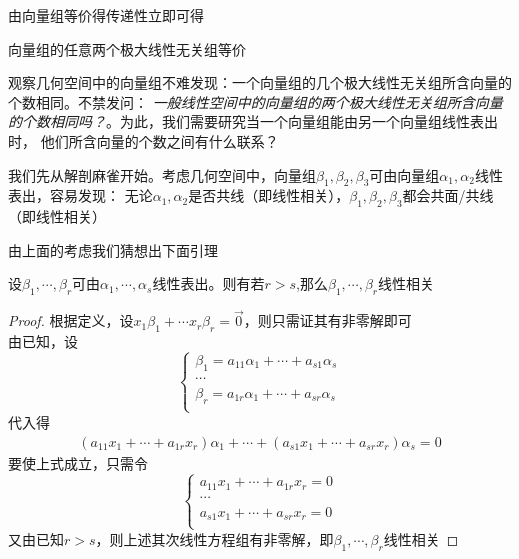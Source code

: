 由向量组等价得传递性立即可得
\begin{theorem}
    向量组的任意两个极大线性无关组等价
\end{theorem}

观察几何空间中的向量组不难发现：一个向量组的几个极大线性无关组所含向量的个数相同。不禁发问：
\emph{一般线性空间中的向量组的两个极大线性无关组所含向量的个数相同吗？}。为此，我们需要研究当一个向量组能由另一个向量组线性表出时，
他们所含向量的个数之间有什么联系？

我们先从解剖麻雀开始。考虑几何空间中，向量组$\beta_1, \beta_2, \beta_3$可由向量组$\alpha_1, \alpha_2$线性表出，容易发现：
无论$\alpha_1, \alpha_2$是否共线（即线性相关），$\beta_1, \beta_2, \beta_3$都会共面/共线（即线性相关）

由上面的考虑我们猜想出下面引理
\begin{lemma}
    设$\beta_1, \cdots, \beta_r$可由$\alpha_1, \cdots, \alpha_s$线性表出。则有若$r > s$,那么$\beta_1, \cdots, \beta_r$线性相关
\end{lemma}

\begin{proof}
    根据定义，设$x_1\beta_1 + \cdots x_r\beta_r = \vec{0}$，则只需证其有非零解即可\\
    由已知，设
    \begin{equation*}
        \begin{cases}
            \beta_1 = a_{11}\alpha_1 + \cdots + a_{s1}\alpha_s\\
            \cdots\\
            \beta_r = a_{1r}\alpha_1 + \cdots + a_{sr}\alpha_s\\
        \end{cases}
    \end{equation*}
    代入得
    \begin{align*}
        (a_{11}x_1 + \cdots + a_{1r}x_r)\alpha_1 + \cdots + (a_{s1}x_1 + \cdots + a_{sr}x_r)\alpha_s = 0
    \end{align*}
    要使上式成立，只需令
    \begin{equation*}
        \begin{cases}
            a_{11}x_1 + \cdots + a_{1r}x_r = 0\\
            \cdots\\
            a_{s1}x_1 + \cdots + a_{sr}x_r = 0\\
        \end{cases}
    \end{equation*}
    又由已知$r > s$，则上述其次线性方程组有非零解，即$\beta_1, \cdots, \beta_r$线性相关
\end{proof}

